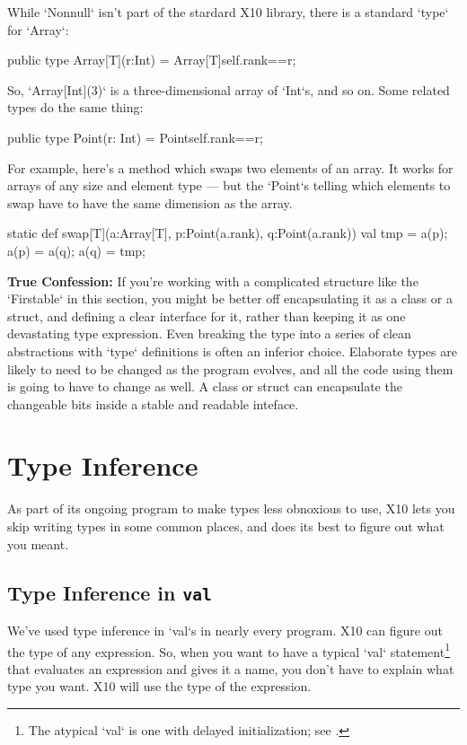 While \xcd`Nonnull` isn't part of the stardard X10 library, there is a
standard \xcd`type` for \xcd`Array`: 
\begin{xten}
public type Array[T](r:Int) = Array[T]{self.rank==r};
\end{xten}
So, \xcd`Array[Int](3)` is a three-dimensional array of \xcd`Int`s, and so on.  
Some related types do the same thing: 
\begin{xten}
public type Point(r: Int) = Point{self.rank==r};
\end{xten}
For example, here's a method which swaps two elements of an array.  It works
for arrays of any size and element type --- but the \xcd`Point`s telling which
elements to swap have to have the same dimension as the array.  
\begin{xtennum}[]
static def swap[T](a:Array[T], p:Point(a.rank), q:Point(a.rank)) {
   val tmp = a(p);
   a(p) = a(q);
   a(q) = tmp;
}
\end{xtennum}



{\bf True Confession:} If you're working with a complicated structure like the
\xcd`Firstable` in this section, you might be better off encapsulating it as a
class or a struct, and defining a clear interface for it, rather than keeping
it as one devastating type expression.  Even breaking the type into a series
of clean abstractions with \xcd`type` definitions is often an inferior choice.
Elaborate types are likely to need to be changed as the program evolves, and
all the code using them is going to have to change as well.  A class or struct
can encapsulate the changeable bits inside a stable and readable inteface.


\section{Type Inference}
\label{sect:TypeInference}

As part of its ongoing program to make types less obnoxious to use, X10 lets
you skip writing types in some common places, and does its best to figure out
what you meant.  

\subsection{Type Inference in {\tt val}}

We've used type inference in \xcd`val`s in nearly every program.   
X10 can figure out the type of any expression.  So, when 
you want to have a typical \xcd`val` statement\footnote{The atypical \xcd`val`
is one with delayed initialization; see
.}
that evaluates an expression and gives it a name, you don't have to explain
what type you want.
X10 will use the type of the expression.

